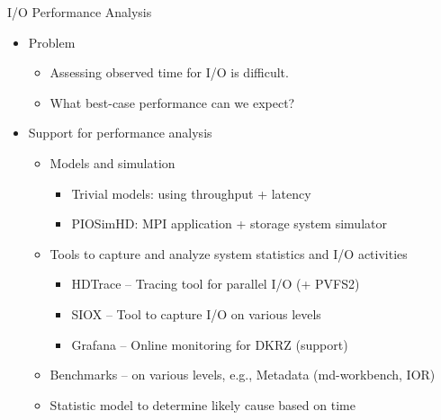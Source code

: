 \documentclass[compress,11pt,xcolor=svgnames,aspectratio=169]{beamer}
\begin{document}
\begin{frame}[fragile]{I/O Performance Analysis}

\begin{itemize}
\setlength\itemsep{0.3cm}

  \item Problem

    \begin{itemize}
    \item Assessing observed time for I/O is difficult.
    \item What best-case performance can we expect?
    \end{itemize}

  \item Support for performance analysis

    \begin{itemize}

    \item Models and simulation

      \begin{itemize}
      \item Trivial models: using throughput + latency
      \item PIOSimHD: MPI application + storage system simulator
      \end{itemize}

    \item Tools to capture and analyze system statistics and I/O activities

      \begin{itemize}
      \item HDTrace -- Tracing tool for parallel I/O (+ PVFS2)
      \item SIOX -- Tool to capture I/O on various levels
      \item Grafana -- Online monitoring for DKRZ (support)
      \end{itemize}

    \item Benchmarks -- on various levels, e.g., Metadata (md-workbench, IOR)

    \item Statistic model to determine likely cause based on time

    \end{itemize}

\end{itemize}

\end{frame}
\end{document}

